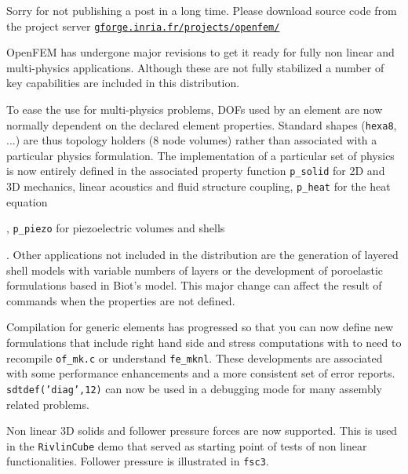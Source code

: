 
Sorry for not publishing a post in a long time. Please download source code from the project server \href{https://gforge.inria.fr/projects/openfem/}{{\tt gforge.inria.fr/projects/openfem/}}



OpenFEM has undergone major revisions to get it ready for fully non linear and multi-physics applications. Although these are not fully stabilized a number of key capabilities are included in this distribution. 

\begin{Eitem}

\item To ease the use for multi-physics problems, DOFs used by an element are now normally dependent on the declared element properties. Standard shapes ({\tt hexa8}, ...) are thus topology holders (8 node volumes) rather than associated with a particular physics formulation. The implementation of a particular set of physics is now entirely defined in the associated property function {\tt p\_solid} for 2D and 3D mechanics, linear acoustics and fluid structure coupling, {\tt p\_heat} for the heat equation\begin{SDT}, {\tt p\_piezo} for piezoelectric volumes and shells\end{SDT}. Other applications not included in the distribution are the generation of layered shell models with variable numbers of layers or the development of poroelastic formulations based in Biot's model. This major change can affect the result of  commands when the properties are not defined. 

\item Compilation for generic elements has progressed so that you can now define new formulations that include right hand side and stress computations with to need to recompile {\tt of\_mk.c} or understand {\tt fe\_mknl}. These developments are associated with some performance enhancements and a more consistent set of error reports. {\tt sdtdef('diag',12)} can now be used in a debugging mode for many assembly related problems. 

\item Non linear 3D solids and follower pressure forces are now supported. This is used in the {\tt RivlinCube} demo that served as starting point of tests of non linear functionalities. Follower pressure is illustrated in {\tt fsc3}.


\end{Eitem}
